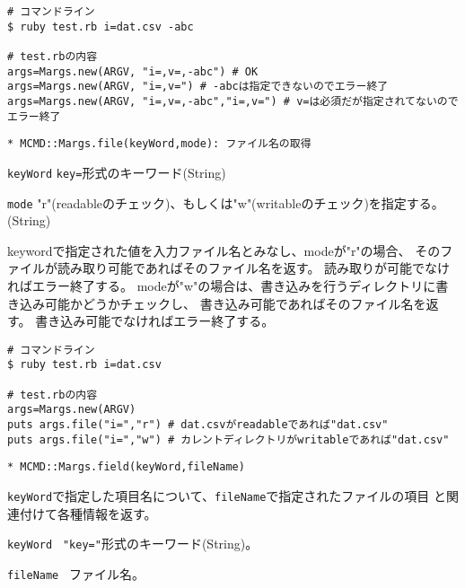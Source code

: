 \begin{Verbatim}[baselinestretch=0.7,frame=single]
# コマンドライン
$ ruby test.rb i=dat.csv -abc

# test.rbの内容
args=Margs.new(ARGV, "i=,v=,-abc") # OK
args=Margs.new(ARGV, "i=,v=") # -abcは指定できないのでエラー終了
args=Margs.new(ARGV, "i=,v=,-abc","i=,v=") # v=は必須だが指定されてないのでエラー終了
\end{Verbatim}

{\Large
\begin{verbatim}
* MCMD::Margs.file(keyWord,mode): ファイル名の取得
\end{verbatim}
}
\begin{description}
	\setlength{\itemindent}{-5mm}
	\item {\large \verb/keyWord/} \verb/key=/形式のキーワード(String)
	\item {\large \verb/mode/} "r"(readableのチェック)、もしくは"w"(writableのチェック)を指定する。(String)
\end{description}

keywordで指定された値を入力ファイル名とみなし、modeが"r"の場合、
そのファイルが読み取り可能であればそのファイル名を返す。
読み取りが可能でなければエラー終了する。
modeが"w"の場合は、書き込みを行うディレクトリに書き込み可能かどうかチェックし、
書き込み可能であればそのファイル名を返す。
書き込み可能でなければエラー終了する。

\begin{Verbatim}[baselinestretch=0.7,frame=single]
# コマンドライン
$ ruby test.rb i=dat.csv

# test.rbの内容
args=Margs.new(ARGV)
puts args.file("i=","r") # dat.csvがreadableであれば"dat.csv"
puts args.file("i=","w") # カレントディレクトリがwritableであれば"dat.csv"
\end{Verbatim}

{\Large
\begin{verbatim}
* MCMD::Margs.field(keyWord,fileName)
\end{verbatim}
}
\verb/keyWord/で指定した項目名について、\verb/fileName/で指定されたファイルの項目
と関連付けて各種情報を返す。


\begin{description}
	\setlength{\itemindent}{-5mm}
	\item {\large \verb/keyWord /} \verb/"key="/形式のキーワード(String)。
	\item {\large \verb/fileName /} ファイル名。
\end{description}

